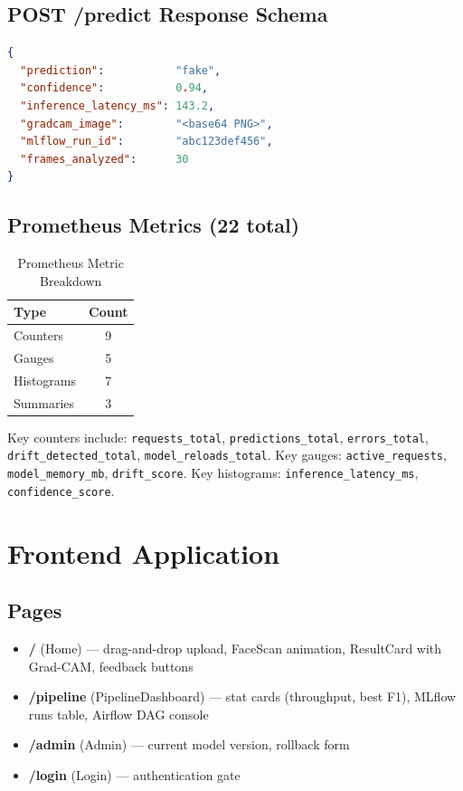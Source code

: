 \documentclass[conference]{IEEEtran}
\begin{document}
\subsection{POST /predict Response Schema}

\begin{lstlisting}[language=json, caption={PredictResponse JSON}]
{
  "prediction":           "fake",
  "confidence":           0.94,
  "inference_latency_ms": 143.2,
  "gradcam_image":        "<base64 PNG>",
  "mlflow_run_id":        "abc123def456",
  "frames_analyzed":      30
}
\end{lstlisting}

\subsection{Prometheus Metrics (22 total)}

\begin{table}[H]
\centering
\caption{Prometheus Metric Breakdown}
\label{tab:prom}
\begin{tabular}{@{}lc@{}}
\toprule
\textbf{Type} & \textbf{Count} \\
\midrule
Counters    & 9 \\
Gauges      & 5 \\
Histograms  & 7 \\
Summaries   & 3 \\
\bottomrule
\end{tabular}
\end{table}

Key counters include: \texttt{requests\_total}, \texttt{predictions\_total}, \texttt{errors\_total}, \texttt{drift\_detected\_total}, \texttt{model\_reloads\_total}. Key gauges: \texttt{active\_requests}, \texttt{model\_memory\_mb}, \texttt{drift\_score}. Key histograms: \texttt{inference\_latency\_ms}, \texttt{confidence\_score}.

\section{Frontend Application}
\label{sec:frontend}

\subsection{Pages}

\begin{itemize}[noitemsep]
  \item \textbf{/} (Home) — drag-and-drop upload, FaceScan animation, ResultCard with Grad-CAM, feedback buttons
  \item \textbf{/pipeline} (PipelineDashboard) — stat cards (throughput, best F1), MLflow runs table, Airflow DAG console
  \item \textbf{/admin} (Admin) — current model version, rollback form
  \item \textbf{/login} (Login) — authentication gate
\end{itemize}
\end{document}
